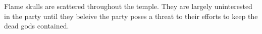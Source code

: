Flame skulls are scattered throughout the temple.
They are largely uninterested in the party until they beleive the party poses a threat to their efforts to keep the dead gods contained.

